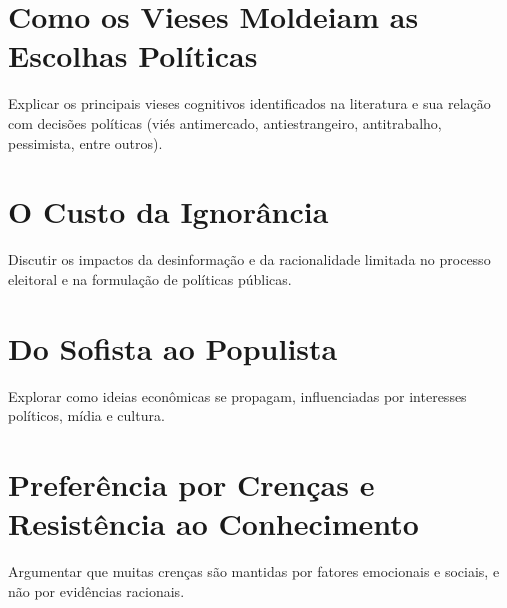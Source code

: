 \section{Como os Vieses Moldeiam as Escolhas Políticas} %

Explicar os principais vieses cognitivos identificados na literatura e sua relação com decisões políticas (viés antimercado, antiestrangeiro, antitrabalho, pessimista, entre outros).

\section{O Custo da Ignorância} %

Discutir os impactos da desinformação e da racionalidade limitada no processo eleitoral e na formulação de políticas públicas.

\section{Do Sofista ao Populista} %

Explorar como ideias econômicas se propagam, influenciadas por interesses políticos, mídia e cultura.

\section{Preferência por Crenças e Resistência ao Conhecimento}

Argumentar que muitas crenças são mantidas por fatores emocionais e sociais, e não por evidências racionais.
